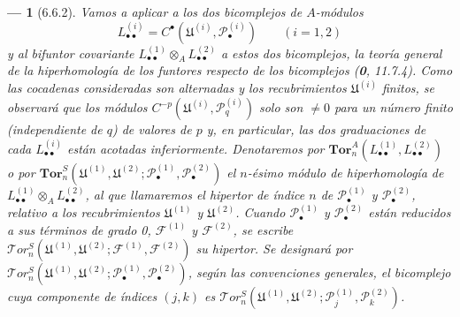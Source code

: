 \documentclass[10pt,oneside,openany]{book}
\theoremstyle{egaenv}\newtheorem*{env}{---}
\theoremstyle{egastatement}
\theoremstyle{egadescription}
\begin{document}
\begin{env}[6.6.2]
Vamos a aplicar a los dos bicomplejos de $A$-módulos
\[
  L_{\bullet\bullet}^{(i)}
  =C^\bullet(\mathfrak U^{(i)},\mathscr P_\bullet^{(i)})
  \qquad(i=1,2)
\] y al bifuntor covariante $L_{\bullet\bullet}^{(1)}\otimes_A L_{\bullet\bullet}^{(2)}$ a estos dos bicomplejos, la teoría general de la hiperhomología de los funtores respecto de los bicomplejos (\textbf{0}, 11.7.4). Como las cocadenas consideradas son \emph{alternadas} y los recubrimientos $\mathfrak U^{(i)}$ finitos, se observará que los módulos $C^{-p}(\mathfrak U^{(i)},\mathscr P_q^{(i)})$ solo son $\ne0$
para un número \emph{finito (independiente de $q$)} de valores de $p$ y, en
particular, las \emph{dos} graduaciones de cada $L_{\bullet\bullet}^{(i)}$ están
\emph{acotadas inferiormente}. Denotaremos por
$\mathbf{Tor}_n^A(L_{\bullet\bullet}^{(1)},L_{\bullet\bullet}^{(2)})$
o por
$\mathbf{Tor}_n^S
(\mathfrak U^{(1)},\mathfrak U^{(2)};
\mathscr P_\bullet^{(1)},\mathscr P_\bullet^{(2)})$
el $n$-ésimo módulo de hiperhomología de
$L_{\bullet\bullet}^{(1)}\otimes_A L_{\bullet\bullet}^{(2)}$, al que
llamaremos el \emph{hipertor} de índice $n$ de
$\mathscr P_\bullet^{(1)}$ y $\mathscr P_\bullet^{(2)}$, relativo a los
recubrimientos $\mathfrak U^{(1)}$ y $\mathfrak U^{(2)}$. Cuando
$\mathscr P_\bullet^{(1)}$ y $\mathscr P_\bullet^{(2)}$ están reducidos a sus
términos de grado 0, $\mathscr F^{(1)}$ y $\mathscr F^{(2)}$, se escribe
$\mathscr{T}\!or_n^S
(\mathfrak U^{(1)},\mathfrak U^{(2)};
\mathscr F^{(1)},\mathscr F^{(2)})$ su hipertor. Se designará por $\mathscr{T}\!or_n^S
(\mathfrak U^{(1)},\mathfrak U^{(2)};
\mathscr P_\bullet^{(1)},\mathscr P_\bullet^{(2)})$, según las convenciones generales, el \emph{bicomplejo} cuya componente de índices $(j,k)$ es
$\mathscr{T}\!or_n^S
(\mathfrak U^{(1)},\mathfrak U^{(2)};
\mathscr P_j^{(1)},\mathscr P_k^{(2)})$.


\end{env}
\end{document}
